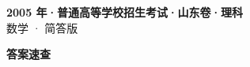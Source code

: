 \documentclass[zihao=-4, a4paper]{ctexart}
\begin{document}
\begin{center}
  {\Large\bfseries 2005 年·普通高等学校招生考试·山东卷·理科}\\[4pt]
  {\large 数学 · 简答版}
\end{center}
\medskip
{}

\clearpage
{}
\begin{center}{\Large\bfseries 答案速查}\end{center}
\medskip

\end{document}
